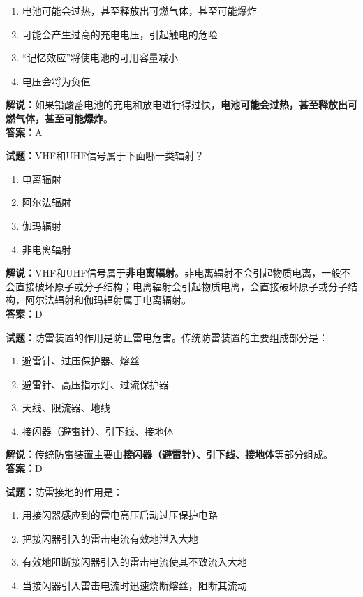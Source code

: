 \documentclass{ctexbook}
\begin{document}
\begin{enumerate}[leftmargin=3em]
	\item 电池可能会过热，甚至释放出可燃气体，甚至可能爆炸
	\item 可能会产生过高的充电电压，引起触电的危险
	\item “记忆效应”将使电池的可用容量减小
	\item 电压会将为负值
\end{enumerate}

\noindent\textbf{解说：}如果铅酸蓄电池的充电和放电进行得过快，\textbf{电池可能会过热，甚至释放出可燃气体，甚至可能爆炸}。\\\noindent\textbf{答案：}A%

\bigskip


\noindent\textbf{试题：}VHF和UHF信号属于下面哪一类辐射？

\begin{enumerate}[leftmargin=3em]
	\item 电离辐射
	\item 阿尔法辐射
	\item 伽玛辐射
	\item 非电离辐射
\end{enumerate}

\noindent\textbf{解说：}VHF和UHF信号属于\textbf{非电离辐射}。非电离辐射不会引起物质电离，一般不会直接破坏原子或分子结构；电离辐射会引起物质电离，会直接破坏原子或分子结构，阿尔法辐射和伽玛辐射属于电离辐射。\\\noindent\textbf{答案：}D

\bigskip


\noindent\textbf{试题：}防雷装置的作用是防止雷电危害。传统防雷装置的主要组成部分是：

\begin{enumerate}[leftmargin=3em]
	\item 避雷针、过压保护器、熔丝
	\item 避雷针、高压指示灯、过流保护器
	\item 天线、限流器、地线
	\item 接闪器（避雷针）、引下线、接地体
\end{enumerate}

\noindent\textbf{解说：}传统防雷装置主要由\textbf{接闪器（避雷针）、引下线、接地体}等部分组成。\\\noindent\textbf{答案：}D

\bigskip


\noindent\textbf{试题：}防雷接地的作用是：

\begin{enumerate}[leftmargin=3em]
	\item 用接闪器感应到的雷电高压启动过压保护电路
	\item 把接闪器引入的雷击电流有效地泄入大地
	\item 有效地阻断接闪器引入的雷击电流使其不致流入大地
	\item 当接闪器引入雷击电流时迅速烧断熔丝，阻断其流动
\end{enumerate}
\end{document}
